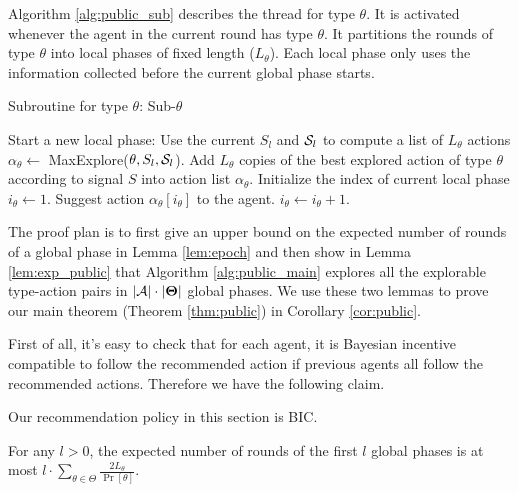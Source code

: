 Algorithm \ref{alg:public_sub} describes the thread for type $\theta$. It is activated whenever the agent in the current round has type $\theta$. It partitions the rounds of type $\theta$ into local phases of fixed length ($L_{\theta}$). Each local phase only uses the information collected before the current global phase starts.

 \begin{algorithm}[H]
    \caption{Subroutine for type $\theta$: Sub-$\theta$ }
    	\label{alg:public_sub}
    \begin{algorithmic}[1]
			\STATE Start a new local phase:
				\STATE Use the current $S_l$ and $\S_l$ to compute a list of $L_{\theta}$ actions $\alpha_{\theta} \leftarrow $ MaxExplore($\theta, S_l, \S_l$).
			\ELSE
				\STATE Add $L_{\theta}$ copies of the best explored action of type $\theta$ according to signal $S$ into action list $\alpha_{\theta}$.
			\ENDIF
			\STATE Initialize the index of current local phase $i_{\theta} \leftarrow 1$.
		\ENDIF
		\STATE Suggest action $\alpha_{\theta} [i_{\theta}]$ to the agent.
		\STATE $i_{\theta} \leftarrow i_{\theta} + 1$.
	\ENDFOR
     \end{algorithmic}
\end{algorithm}


The proof plan is to first give an upper bound on the expected number of rounds of a global phase in Lemma \ref{lem:epoch} and then show in Lemma \ref{lem:exp_public} that Algorithm \ref{alg:public_main} explores all the explorable type-action pairs in $|\A| \cdot |\varTheta|$ global phases. We use these two lemmas to prove our main theorem (Theorem \ref{thm:public}) in Corollary \ref{cor:public}.

First of all, it's easy to check that for each agent, it is Bayesian incentive compatible to follow the recommended action if previous agents all follow the recommended actions. Therefore we have the following claim.
\begin{claim}
\label{clm:public_BIC}
Our recommendation policy in this section is BIC.
\end{claim}

\begin{lemma}
\label{lem:epoch}
For any $l>0$, the expected number of rounds of the first $l$ global phases is at most $l \cdot \sum_{\theta\in\varTheta} \frac{2L_{\theta}}{\Pr[\theta]}$.
\end{lemma}

